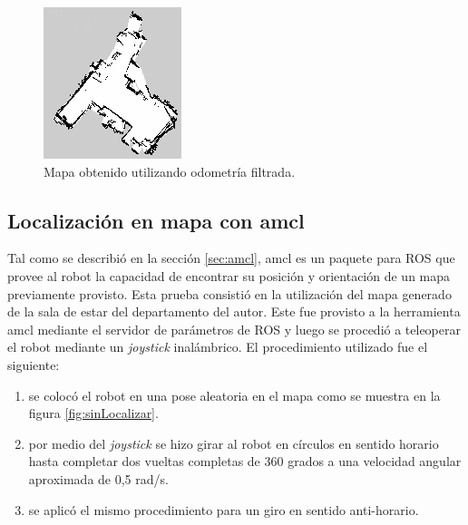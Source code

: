 \begin{figure}[ht]
    \centering
    \includegraphics[scale=1.2]{./Figures/mapa_lindo.png}
    \caption{Mapa obtenido utilizando odometría filtrada.}
    \label{fig:mapaLindo}
\end{figure}



\subsection{Localización en mapa con amcl}

Tal como se describió en la sección \ref{sec:amcl}, amcl es un paquete para ROS que provee al robot la capacidad de encontrar su posición y orientación de un mapa previamente provisto. Esta prueba consistió en la utilización del mapa generado de la sala de estar del departamento del autor. Este fue provisto a la herramienta amcl mediante el servidor de parámetros de ROS y luego se procedió a teleoperar el robot mediante un \textit{joystick} inalámbrico. El procedimiento utilizado fue el siguiente:

\begin{enumerate}
    \item se colocó el robot en una pose aleatoria en el mapa como se muestra en la figura \ref{fig:sinLocalizar}.
    \item por medio del \textit{joystick} se hizo girar al robot en círculos en sentido horario hasta completar dos vueltas completas de 360 grados a una velocidad angular aproximada de 0,5 rad/s.
    \item se aplicó el mismo procedimiento para un giro en sentido anti-horario.
\end{enumerate}


